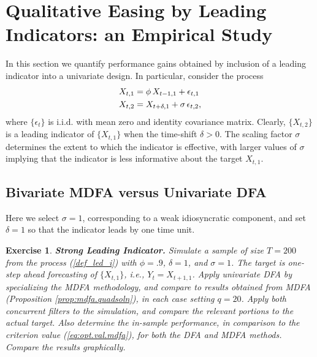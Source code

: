 \documentclass[a4paper]{book}
\newtheorem{Exercise}{Exercise}
\begin{document}
\section{Qualitative Easing by Leading Indicators: an Empirical Study}
   \label{leading_ind}

In this section we quantify performance gains 
  obtained by inclusion of a leading indicator into a univariate design.
 In particular, consider the process
\begin{align}
 X_{t,1} & = \phi \, X_{t-1,1} + \epsilon_{t,1} \notag \\
 X_{t,2} & = X_{t+\delta,1} + \sigma \, \epsilon_{t,2}, \label{def_led_i}
\end{align} 
  where $\{ \epsilon_t \}$ is i.i.d. with mean zero and identity covariance matrix.
  Clearly, $\{ X_{t,2} \}$ is a leading indicator of $\{ X_{t,1} \}$ when
 the time-shift  $\delta > 0$.   The scaling factor $\sigma$ determines  
 the extent to which the indicator is effective, with 
 larger values of  $\sigma$ implying that the indicator is less 
informative about the target $X_{t,1}$.

\subsection{Bivariate MDFA versus Univariate DFA}
 \label{bimdfaudfa}

Here   we select $\sigma=1$, corresponding to a weak
 idiosyncratic component, and set $\delta=1$ so that the indicator
 leads by one time unit.
 

\begin{Exercise} {\bf Strong Leading Indicator.} \rm
\label{exer:bimdfa-udfa}
 Simulate a sample of size $T=200$ from the process (\ref{def_led_i}) with
 $\phi = .9$, $\delta = 1$, and $\sigma = 1$.  The target is one-step
 ahead forecasting of $\{ X_{t,1} \}$, i.e., $Y_t = X_{t+1,1}$.
  Apply univariate DFA by specializing the MDFA methodology, and compare
 to results obtained from MDFA  (Proposition \ref{prop:mdfa.quadsoln}),
 in each case setting $q=20$.  
  Apply both concurrent filters 
 to the simulation, and compare the relevant portions to the actual
 target.  Also determine the in-sample performance, in comparison to the
   criterion value  (\ref{eq:opt.val.mdfa}), for both the DFA and MDFA methods.
 Compare the results graphically.
\end{Exercise}
\end{document}
